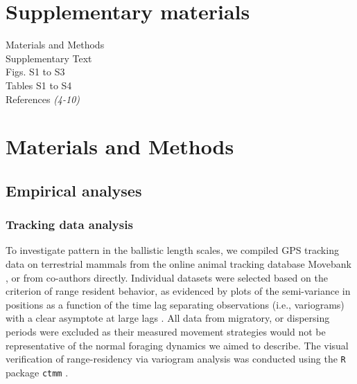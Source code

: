 \documentclass[12pt]{article}
\begin{document}
\section*{Supplementary materials}
Materials and Methods\\
Supplementary Text\\
Figs. S1 to S3\\
Tables S1 to S4\\
References \textit{(4-10)}


\section*{Materials and Methods}



\subsection*{Empirical analyses}

\subsubsection*{Tracking data analysis}

To investigate pattern in the ballistic length scales, we compiled GPS tracking data on terrestrial mammals from the online animal tracking database Movebank \cite{Wikelski:2017uy}, or from co-authors directly. Individual datasets were selected based on the criterion of range resident behavior, as evidenced by plots of the semi-variance in positions as a function of the time lag separating observations (i.e., variograms) with a clear asymptote at large lags \cite{Fleming:2014jr, Calabrese:2016ey}. All data from migratory, or dispersing periods were excluded as their measured movement strategies would not be representative of the normal foraging dynamics we aimed to describe. The visual verification of range-residency via variogram analysis \cite{Fleming:2014jr} was conducted using the \texttt{R} package \texttt{ctmm} \cite{Calabrese:2016ey}.
\end{document}
